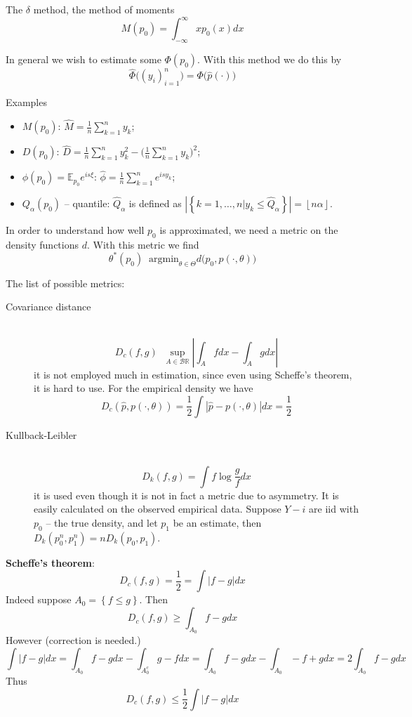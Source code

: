 \documentclass[a4paper]{article}
\newcommand{\obj}[1]{{\left\{ #1 \right \}}}
\newcommand{\induc}[1]{{\left . #1 \right \vert}}
\newcommand{\abs}[1]{{\left | #1 \right |}}
\newcommand{\floor}[1]{{\left\lfloor #1 \right\rfloor}}
\newcommand{\Real}{\mathbb{R}}
\newcommand{\borel}{\mathcal{B}}
\newcommand{\Ex}{\mathbb{E}}
\newcommand{\defn}{\mathop{\overset{\Delta}{=}}\nolimits}
\begin{document}
The $\delta$ method, the method of moments
\[M(p_0) = \int_{-\infty}^\infty x p_0(x) dx\]

In general we wish to estimate some $\Phi(p_0)$. With this method we do this by
\[\hat{\Phi}\big((y_i)_{i=1}^n\big) = \Phi\big(\hat{p}(\cdot)\big)\]

Examples
\begin{itemize}
	\item $M(p_0)$: $\hat{M} = \frac{1}{n}\sum_{k=1}^n y_k$;
	\item $D(p_0)$: $\hat{D} = \frac{1}{n}\sum_{k=1}^n y_k^2 - \big(\frac{1}{n}\sum_{k=1}^n y_k\big)^2$;
	\item $\phi(p_0) = \Ex_{p_0} e^{is\xi}$: $\hat{\phi} = \frac{1}{n}\sum_{k=1}^n e^{isy_k}$;
	\item $Q_\alpha(p_0)$ -- quantile: $\hat{Q}_\alpha$ is defined as $\abs{\obj{\induc{k=1,\ldots,n} y_k \leq \hat{Q}_\alpha}} = \floor{n\alpha}$.
\end{itemize}

In order to understand how well $p_0$ is approximated, we need a metric on the density functions $d$. With this metric we find
\[\theta^*(p_0) \defn \text{argmin}_{\theta \in\Theta} d\Big(p_0, p(\cdot,\theta)\Big) \]

The list of possible metrics: \begin{description}
	\item[Covariance distance]\hfill \\
	\[D_c(f,g)\defn \sup_{A\in \borel{\Real}} \abs{\int_A f dx - \int_A g dx}\]
	it is not employed much in estimation, since even using Scheffe's theorem, it is hard to use.
	For the empirical density we have
	\[D_c(\hat{p}, p(\cdot,\theta)) = \frac{1}{2} \int \abs{\hat{p} - p(\cdot,\theta)}dx = \frac{1}{2}\]
	\item[Kullback-Leibler]\hfill \\
	\[D_k(f,g) = \int f \log \frac{g}{f} dx\]
	it is used even though it is not in fact a metric due to asymmetry.
	It is easily calculated on the observed empirical data.
	Suppose $Y-i$ are iid with $p_0$ -- the true density, and let $p_1$ be an estimate, then $D_k(p_0^n, p_1^n) = nD_k(p_0,p_1)$.
\end{description}

\noindent\textbf{Scheffe's theorem}:
\[D_c(f,g) = \frac{1}{2} = \int \abs{f-g}dx\]
Indeed suppose $A_0 = \obj{ f\leq g }$. Then
\[D_c(f,g)\geq \int_{A_0} f-g dx\]
However (correction is needed.)
\[\int \abs{f-g} dx = \int_{A_0} f-g dx - \int_{A_0^c} g-f dx = \int_{A_0} f-g dx  - \int_{A_0} -f+g dx = 2\int_{A_0} f-g dx \]
Thus 
\[D_c(f,g)\leq \frac{1}{2} \int \abs{f-g} dx \]
\end{document}
